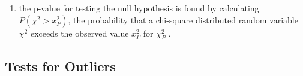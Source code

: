 \begin{enumerate}
    \item the p-value for testing the null hypothesis is found by calculating $P(\chi^2 > x^2_P )$, the probability that a chi-square distributed random variable $\chi^2$ exceeds the observed value $x^2_P$ for $\chi^2_P$ .
    \hfill \cite{statistics/book/Statistics-for-Data-Scientists/Maurits-Kaptein}

\end{enumerate}






\subsection{Tests for Outliers}

